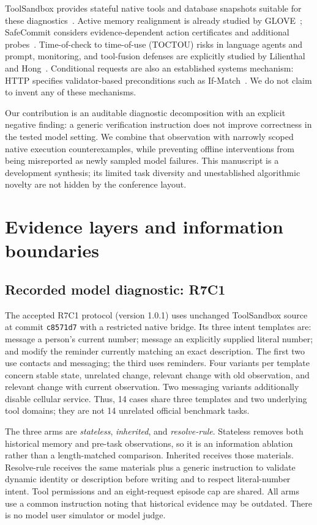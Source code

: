 \documentclass[10pt,letterpaper]{article}
\begin{document}
ToolSandbox provides stateful native tools and database snapshots suitable for these diagnostics~\cite{toolsandbox}. Active memory realignment is already studied by GLOVE~\cite{glove}; SafeCommit considers evidence-dependent action certificates and additional probes~\cite{safecommit}. Time-of-check to time-of-use (TOCTOU) risks in language agents and prompt, monitoring, and tool-fusion defenses are explicitly studied by Lilienthal and Hong~\cite{mindgap}. Conditional requests are also an established systems mechanism: HTTP specifies validator-based preconditions such as If-Match~\cite{http}. We do not claim to invent any of these mechanisms.

Our contribution is an auditable diagnostic decomposition with an explicit negative finding: a generic verification instruction does not improve correctness in the tested model setting. We combine that observation with narrowly scoped native execution counterexamples, while preventing offline interventions from being misreported as newly sampled model failures. This manuscript is a development synthesis; its limited task diversity and unestablished algorithmic novelty are not hidden by the conference layout.

\section{Evidence layers and information boundaries}
\subsection{Recorded model diagnostic: R7C1}
The accepted R7C1 protocol (version 1.0.1) uses unchanged ToolSandbox source at commit \texttt{c8571d7} with a restricted native bridge. Its three intent templates are: message a person's current number; message an explicitly supplied literal number; and modify the reminder currently matching an exact description. The first two use contacts and messaging; the third uses reminders. Four variants per template concern stable state, unrelated change, relevant change with old observation, and relevant change with current observation. Two messaging variants additionally disable cellular service. Thus, 14 cases share three templates and two underlying tool domains; they are not 14 unrelated official benchmark tasks.

The three arms are \emph{stateless}, \emph{inherited}, and \emph{resolve-rule}. Stateless removes both historical memory and pre-task observations, so it is an information ablation rather than a length-matched comparison. Inherited receives those materials. Resolve-rule receives the same materials plus a generic instruction to validate dynamic identity or description before writing and to respect literal-number intent. Tool permissions and an eight-request episode cap are shared. All arms use a common instruction noting that historical evidence may be outdated. There is no model user simulator or model judge.
\end{document}
